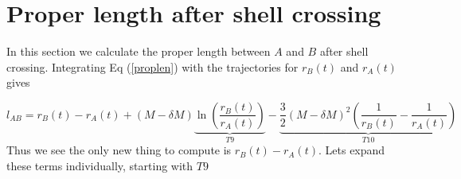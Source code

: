 \documentclass[aps,showpacs,onecolumn,floats,prd,superscriptaddress,nofootinbib]{revtex4-1}
\begin{document}
%
%
%
%
%
%

\newpage

\section{Proper length after shell crossing}

In this section we calculate the proper length between $A$ and $B$ after shell crossing. Integrating Eq (\ref{proplen}) with the trajectories for $r_B(t)$ and $r_A(t)$ gives 

\begin{equation}
	l_{AB} = r_B(t) - r_A(t) + (M - \delta M) \underbrace{\ln \left( \frac{r_B(t)}{r_A(t)} \right)}_{T9} - \underbrace{\frac{3}{2} (M - \delta M)^2 \left( \frac{1}{r_B(t)} - \frac{1}{r_A(t)} \right)}_{T10}
\end{equation}
Thus we see the only new thing to compute is $r_B(t) - r_A(t)$. Lets expand these terms individually, starting with $T9$
\end{document}
